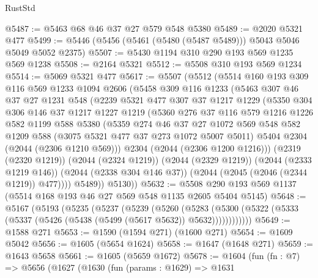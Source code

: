 \begin{lexlean}{RustStd}
\begin{coremodule}
@5487 := @5463 @68 @46 @37 @27 @579 @548 @5380
@5489 := @2020 @5321 @477
@5499 := @5446 (@5456 (@5461 (@5480 (@5487 @5489))) @5043 @5046 @5049 @5052 @2375)
@5507 := @5430 @1194 @310 @290 @193 @569 @1235 @569 @1238
@5508 := @2164 @5321
@5512 := @5508 @310 @193 @569 @1234
@5514 := @5069 @5321 @477
@5617 := @5507
    (@5512
      (@5514
        @160
        @193
        @309
        @116
        @569
        @1233
        @1094
        @2606
        (@5458
          @309
          @116
          @1233
          (@5463
            @307
            @46
            @37
            @27
            @1231
            @548
            (@2239
              @5321
              @477
              @307
              @37
              @1217
              @1229
              (@5350
                @304
                @306
                @146
                @37
                @1217
                @1227
                @1219
                (@5360
                  @276
                  @37
                  @116
                  @579
                  @1216
                  @1226
                  @582
                  @1199
                  @588
                  @5380
                  (@5359
                    @274
                    @46
                    @37
                    @27
                    @1072
                    @569
                    @548
                    @582
                    @1209
                    @588
                    (@3075 @5321 @477 @37 @273 @1072 @5007 @5011)
                    @5404
                    @2304
                    (@2044 (@2306 @1210 @569)))
                  @2304
                  (@2044 (@2306 @1200 @1216)))
                (@2319 (@2320 @1219))
                (@2044 (@2324 @1219))
                (@2044 (@2329 @1219))
                (@2044 (@2333 @1219 @146))
                (@2044 (@2338 @304 @146 @37))
                (@2044 (@2045 (@2046 (@2344 @1219)) @477))))
            @5489))
        @5130))
@5632 := @5508 @290 @193 @569 @1137 (@5514 @168 @193 @46 @27 @569 @548 @1135 @2605 @5404 @5145)
@5648 := @5167
    (@5193
      (@5235
        (@5237
          (@5239
            (@5260
              (@5283
                (@5300 (@5322 (@5333 (@5337 (@5426 (@5438 (@5499 (@5617 @5632)) @5632))))))))))))
@5649 := @1588 @271
@5653 := @1590 (@1594 @271) (@1600 @271)
@5654 := @1609 @5042
@5656 := @1605 (@5654 @1624)
@5658 := @1647 (@1648 @271)
@5659 := @1643 @5658
@5661 := @1605 (@5659 @1672)
@5678 := @1604
    (fun (fn : @7) =>
    @5656
      (@1627
        (@1630
          (fun (params : @1629) =>
          @1631

\end{coremodule}
\end{lexlean}
